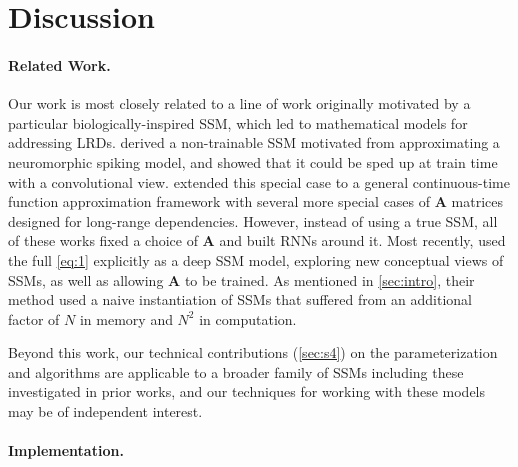 
\section{Discussion}
\label{sec:discussion}


\paragraph{Related Work.}
Our work is most closely related to a line of work originally motivated by a particular biologically-inspired SSM, which led to mathematical models for addressing LRDs. %
\citet{voelker2019dynamical,voelker2019legendre} derived a non-trainable SSM motivated from approximating a neuromorphic spiking model, and \citet{chilkuri2021parallelizing} showed that it could be sped up at train time with a convolutional view.
\citet{gu2020hippo} extended this special case to a general continuous-time function approximation framework with several more special cases of \( \bm{A} \) matrices designed for long-range dependencies.
However, instead of using a true SSM, all of these works fixed a choice of \( \bm{A} \) and built RNNs around it.
Most recently, \citet{gu2021lssl} used the full \eqref{eq:1} explicitly as a deep SSM model, exploring new conceptual views of SSMs, as well as allowing \( \bm{A} \)  to be trained.
As mentioned in \cref{sec:intro}, their method used a naive instantiation of SSMs that suffered from an additional factor of \( N \) in memory and \( N^2 \) in computation.

Beyond this work, our technical contributions (\cref{sec:s4}) on the \methodabbrv{} parameterization and algorithms are applicable to a broader family of SSMs including these investigated in prior works,
and our techniques for working with these models may be of independent interest.


\paragraph{Implementation.}

